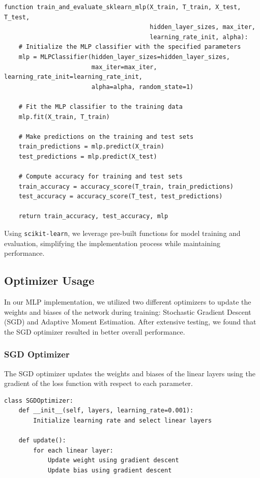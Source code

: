 \documentclass[a4paper,12pt]{article}
\begin{document}
\newpage
\begin{verbatim}
function train_and_evaluate_sklearn_mlp(X_train, T_train, X_test, T_test,
                                        hidden_layer_sizes, max_iter,
                                        learning_rate_init, alpha):
    # Initialize the MLP classifier with the specified parameters
    mlp = MLPClassifier(hidden_layer_sizes=hidden_layer_sizes,
                        max_iter=max_iter, learning_rate_init=learning_rate_init,
                        alpha=alpha, random_state=1)

    # Fit the MLP classifier to the training data
    mlp.fit(X_train, T_train)
    
    # Make predictions on the training and test sets
    train_predictions = mlp.predict(X_train)
    test_predictions = mlp.predict(X_test)
    
    # Compute accuracy for training and test sets
    train_accuracy = accuracy_score(T_train, train_predictions)
    test_accuracy = accuracy_score(T_test, test_predictions)
    
    return train_accuracy, test_accuracy, mlp
\end{verbatim}

Using \texttt{scikit-learn}, we leverage pre-built functions for model training and evaluation, simplifying the implementation process while maintaining performance.

\subsection{Optimizer Usage}
In our MLP implementation, we utilized two different optimizers to update the weights and biases of the network during training: Stochastic Gradient Descent (SGD) and Adaptive Moment Estimation. After extensive testing, we found that the SGD optimizer resulted in better overall performance.

\subsubsection{SGD Optimizer}
The SGD optimizer updates the weights and biases of the linear layers using the gradient of the loss function with respect to each parameter.

\begin{verbatim}
class SGDOptimizer:
    def __init__(self, layers, learning_rate=0.001):
        Initialize learning rate and select linear layers

    def update():
        for each linear layer:
            Update weight using gradient descent
            Update bias using gradient descent
\end{verbatim}
\end{document}

